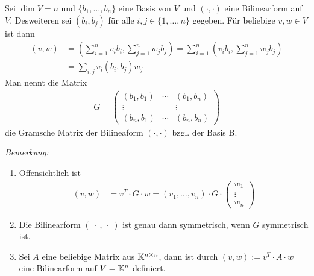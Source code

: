 
\begin{mydef}\label{gramscheMatrix}

    Sei $\dim V = n$ und $\{ b_1, \ldots, b_n \}$ eine Basis von $V$ und $(\cdot ,\cdot )$ eine Bilinearform auf $V$.
    Desweiteren sei $(b_i, b_j)$ für alle $i, j \in \{1, \ldots, n \}$ gegeben.
    Für beliebige $v, w \in V$ ist dann
    \begin{align*}
        (v,w)   & = \left( \sum\limits_{i = 1}^n v_i b_i, \sum\limits_{j = 1}^n w_j b_j \right) = \sum\limits_{i = 1}^n \left(v_i b_i ,\sum\limits_{j = 1}^n w_j b_j \right) \\
        & = \sum\limits_{i, j} v_i(b_i, b_j) w_j
    \end{align*}
    Man nennt die Matrix
    \begin{align*}
        G =
        \begin{pmatrix}
            (b_1,b_1) & \cdots & (b_1,b_n) \\
            \vdots & & \vdots \\
            (b_n,b_1) & \cdots & (b_n,b_n)
        \end{pmatrix}
    \end{align*}
    die Gramsche Matrix der Bilineaform $(\cdot , \cdot )$ bzgl. der Basis B.
\end{mydef}
\textit{Bemerkung:}
\begin{enumerate}
    \item \label{gramscheMatrix-1} Offensichtlich ist
        \begin{align*}
            (v,w) & = v^T \cdot G \cdot w = (v_1, \ldots, v_n) \cdot G \cdot
            \begin{pmatrix}
                w_1\\ \vdots \\ w_n
            \end{pmatrix}
        \end{align*}
    \item \label{gramscheMatrix-2} Die Bilinearform $(\ \cdot \ , \ \cdot \ )$ ist genau dann symmetrisch, wenn $G$ symmetrisch ist.
    \item \label{gramscheMatrix-3} Sei $A$ eine beliebige Matrix aus $\mathbb{K}^{n \times n}$, dann ist durch $(v,w) := v^T \cdot A \cdot w$ eine Bilinearform auf $V = \mathbb{K}^n$ definiert.
\end{enumerate}


